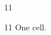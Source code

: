 \documentclass[paper=A4]{ropas-poster}
\begin{document}
\begin{postergrid}{1}{1}
\begin{posterblock}{1}{1}
One cell.
\end{posterblock}
\end{postergrid}
\end{document}
